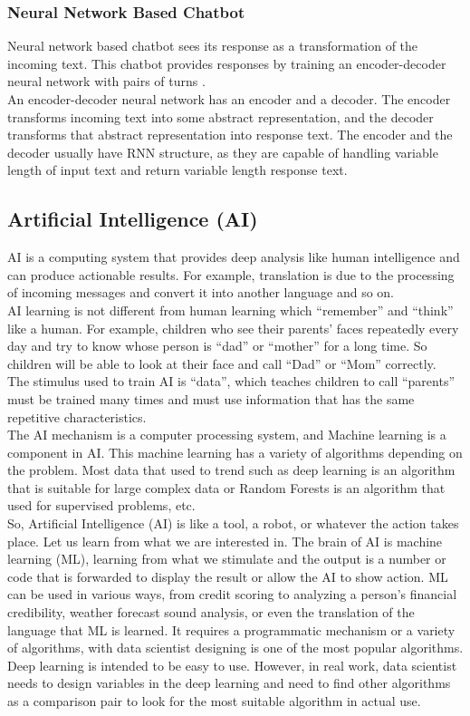 \documentclass[12pt,oneside,openright,a4paper]{cpe-english-project}
\begin{document}
\subsubsection{Neural Network Based Chatbot}
Neural network based chatbot sees its response as a transformation of the incoming text. This chatbot
provides responses by training an encoder-decoder neural network with pairs of turns \cite{five_types_of_chatbot,rule_based_vs_nlp}.\\
An encoder-decoder neural network has an encoder and a decoder. The encoder transforms incoming
text into some abstract representation, and the decoder transforms that abstract representation
into response text. The encoder and the decoder usually have RNN structure, as they are capable
of handling variable length of input text and return variable length response text.

\subsection{Artificial Intelligence (AI)}
AI is a computing system that provides deep analysis like human intelligence and can produce
actionable results. For example, translation is due to the processing of incoming messages
and convert it into another language and so on.\\
AI learning is not different from human learning which “remember” and “think” like a human.
For example, children who see their parents' faces repeatedly every day and try to know whose
person is “dad” or “mother” for a long time. So children will be able to look at their face and
call “Dad” or “Mom” correctly.\\
The stimulus used to train AI is “data”, which teaches children to call “parents” must be trained
many times and must use information that has the same repetitive characteristics\cite{machine_learning_vs_deep_learning}.\\
The AI mechanism is a computer processing system, and Machine learning is a component in AI.
This machine learning has a variety of algorithms depending on the problem. Most data that used to
trend such as deep learning is an algorithm that is suitable for large complex data or Random Forests
is an algorithm that used for supervised problems, etc.\\
So, Artificial Intelligence (AI) is like a tool, a robot, or whatever the action takes place.
Let us learn from what we are interested in. The brain of AI is machine learning (ML),
learning from what we stimulate and the output is a number or code that is forwarded to display
the result or allow the AI to show action. ML can be used in various ways, from credit scoring
to analyzing a person's financial credibility, weather forecast sound analysis, or even the
translation of the language that ML is learned. It requires a programmatic mechanism or a variety
of algorithms, with data scientist designing is one of the most popular algorithms.\\
Deep learning is intended to be easy to use. However, in real work, data scientist needs to
design variables in the deep learning and need to find other algorithms as a comparison pair
to look for the most suitable algorithm in actual use.
\end{document}
